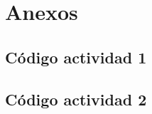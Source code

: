 \section*{Anexos}\label{sec:anexo}

\subsection{Código actividad 1}


\subsection{Código actividad 2}
